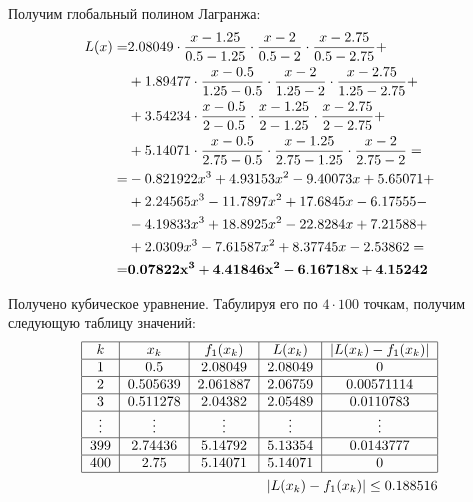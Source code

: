 Получим глобальный полином Лагранжа:
\nopagebreak
\begin{equation}
    \begin{split}
    L(x) = & 2.08049\cdot\frac{x-1.25}{0.5-1.25}\cdot\frac{x-2}{0.5-2}\cdot\frac{x-2.75}{0.5-2.75} +\\
    &+ 1.89477\cdot\frac{x-0.5}{1.25-0.5}\cdot\frac{x-2}{1.25-2}\cdot\frac{x-2.75}{1.25-2.75} +\\
    &+ 3.54234\cdot\frac{x-0.5}{2-0.5}\cdot\frac{x-1.25}{2-1.25}\cdot\frac{x-2.75}{2-2.75} +\\
    &+ 5.14071\cdot\frac{x-0.5}{2.75-0.5}\cdot\frac{x-1.25}{2.75-1.25}\cdot\frac{x-2}{2.75-2} =\\
    = & -0.821922 x^3 + 4.93153 x^2 - 9.40073 x + 5.65071 +\\
    &+ 2.24565 x^3 - 11.7897 x^2 + 17.6845 x - 6.17555 -\\
    &- 4.19833 x^3 + 18.8925 x^2 - 22.8284 x + 7.21588 +\\
    &+ 2.0309 x^3 - 7.61587 x^2 + 8.37745 x - 2.53862 = \\
    = & \bf 0.07822 x^3 + 4.41846 x^2 - 6.16718 x + 4.15242
    \end{split}
\end{equation}

Получено кубическое уравнение. Табулируя его по $4\cdot100$ точкам, получим следующую таблицу значений:
\begin{align}
    \begin{tabular}{|c|c|c|c|c|}
        \hline
        $k$ & $x_k$ & $f_1(x_k)$ & $L(x_k)$ & $|L(x_k)-f_1(x_k)|$ \\
        \hline
        1 & 0.5      & 2.08049 & 2.08049 & 0 \\
        \hline
        2 & 0.505639 & 2.061887& 2.06759 &  0.00571114 \\
        \hline
        3 & 0.511278 & 2.04382 & 2.05489 &  0.0110783 \\
        \hline
        $\vdots$ & $\vdots$ & $\vdots$ & $\vdots$ &  $\vdots$ \\
        \hline
        399 & 2.74436   & 5.14792 & 5.13354 & 0.0143777 \\
        \hline
        400 & 2.75 & 5.14071  & 5.14071 &  0 \\
        \hline
    \end{tabular}\\
    |L(x_k)-f_1(x_k)| \le 0.188516
\end{align}

\clearpage

